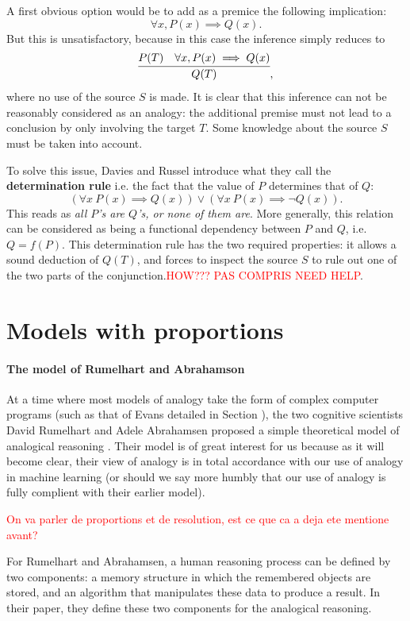 A first obvious option would be to add as a premice the following implication:
$$\forall x, P(x) \implies Q(x).$$
But this is unsatisfactory, because in this case the inference simply reduces
to
$$\infer{Q(T)}{P(T) & \forall x, P(x) \implies Q(x)},$$ where no use of the
source $S$ is made. It is clear that this inference can not be reasonably
considered as an analogy: the additional premise must not lead to a conclusion
by only involving the target $T$. Some knowledge about the source $S$ must be
taken into account.

To solve this issue, Davies and Russel introduce what they call the
\textbf{determination rule} i.e. the fact that the value of $P$ determines that
of $Q$:
$$\left(\forall x ~ P(x) \implies Q(x)\right) \vee \left(\forall x ~ P(x) \implies
\neg Q(x)\right).$$
This reads as \textit{all $P$'s are $Q$'s, or none of them are}. More
generally, this relation can be considered as being a functional dependency
between $P$ and $Q$, i.e. $Q = f(P)$. This determination rule has the two
required properties: it allows a sound deduction of $Q(T)$, and forces to
inspect the source $S$ to rule out one of the two parts of the
conjunction.\textcolor{red}{HOW??? PAS COMPRIS NEED HELP}.



\section{Models with proportions}

\paragraph{The model of Rumelhart and Abrahamson\\}

At a time where most models of analogy take the form of complex computer
programs (such as that of Evans detailed in Section ), the two
cognitive scientists David Rumelhart and Adele Abrahamsen proposed a simple
theoretical model of analogical reasoning \cite{RumAbr73}. Their model is of
great interest for us because as it will become clear, their view of analogy is
in total accordance with our use of analogy in machine learning (or should we
say more humbly that our use of analogy is fully complient with their earlier
model).

\textcolor{red}{On va parler de proportions et de resolution, est ce que ca a
deja ete mentione avant?}

For Rumelhart and Abrahamsen, a human reasoning process can be defined by two
components: a memory structure in which the remembered objects are stored, and
an algorithm that manipulates these data to produce a result. In their paper,
they define these two components for the analogical reasoning.

